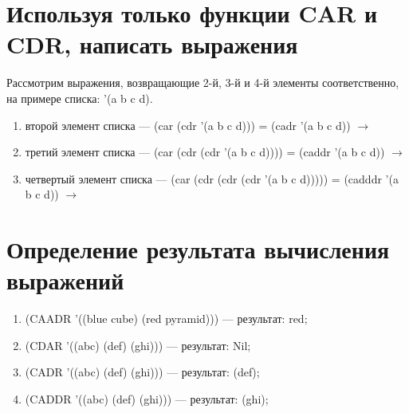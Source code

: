 \documentclass[a4paper, 14pt, unknownkeysallowed]{extreport}
\begin{document}
\clearpage
\section{Используя только функции CAR и CDR, написать выражения}
Рассмотрим выражения, возвращающие 2-й, 3-й и 4-й элементы соответственно, на примере списка: '(a b c d).
\begin{enumerate}
	\item второй элемент списка --- (car (cdr '(a b c d))) = (cadr '(a b c d)) $\rightarrow$ 
	\item третий элемент списка --- (car (cdr (cdr '(a b c d)))) = (caddr '(a b c d)) $\rightarrow$
	\item четвертый элемент списка --- (car (cdr (cdr (cdr '(a b c d))))) = (cadddr '(a b c d)) $\rightarrow$
\end{enumerate}

\section{Определение результата вычисления выражений}
\begin{enumerate}
	\item (CAADR '((blue cube) (red pyramid))) --- результат: red;
	\item (CDAR '((abc) (def) (ghi))) --- результат: Nil;
	\item (CADR '((abc) (def) (ghi))) --- результат: (def);
	\item (CADDR '((abc) (def) (ghi))) --- результат: (ghi);
\end{enumerate}
\end{document}
